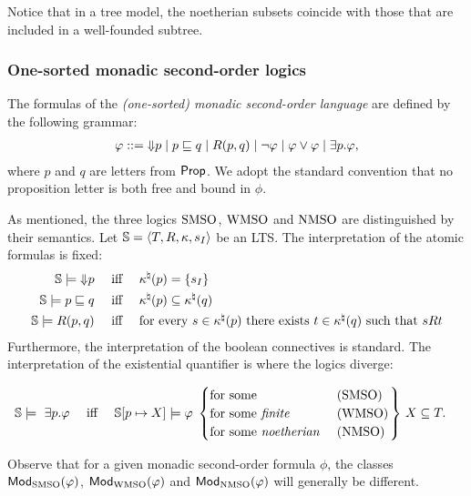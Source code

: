 Notice that in a tree model, the noetherian subsets coincide with those that
are included in a well-founded subtree.

\subsubsection*{One-sorted monadic second-order logics}
%
\begin{definition}\label{def:mso}
The formulas of the \emph{(one-sorted) monadic second-order language} are
defined by the following grammar:
%
\begin{eqnarray*}\label{EQ_mso}
  \phi \isbnf  \here{p} \mid p \inc q \mid R(p,q) \mid \lnot\phi 
     \mid \phi\lor\phi \mid \exists p.\phi,
\end{eqnarray*}
where $p$ and $q$ are letters from $\mathsf{Prop}$.
We  adopt the standard convention that no proposition letter is both free and
bound in $\phi$.
\end{definition}


As mentioned, the three logics $\mathrm{SMSO}$, $\mathrm{WMSO}$ and $\mathrm{NMSO}$ are distinguished by
their semantics. 
Let  $\mathbb{S} = \langle{T,R,\kappa, s_I}\rangle$ be an LTS.
The interpretation of the atomic formulas is fixed:
\begin{align*}
\bbS \models \here{p} & \quad\text{ iff }\quad  \tsval(p) = \{s_I\} \\
\bbS \models p \inc q & \quad\text{ iff }\quad  \tsval(p) \subseteq \tsval(q) \\
\bbS \models R(p,q) & \quad\text{ iff }\quad  \text{for every $s\in \tsval(p)$ there exists $t\in \tsval(q)$ such that $sRt$} 
\end{align*}
Furthermore, the interpretation of the boolean connectives is standard.
The interpretation of the existential quantifier is where the logics diverge:

\begin{align*}
\bbS \models\ \exists p. \phi  & \quad\text{ iff }\quad  \bbS[p \mapsto X] \models \phi \,
\left.\begin{cases}
   \text{for some }                   & (\smso)
\\ \text{for some \emph{finite} }     & (\wmso) 
\\ \text{for some \emph{noetherian} } & (\nmso)
\end{cases}\right\}\,
 X \subseteq T.
\end{align*}

Observe that for a given monadic second-order formula $\phi$, the classes 
$\mathsf{Mod}_{\mathrm{SMSO}}(\varphi)$, $\mathsf{Mod}_{\mathrm{WMSO}}(\varphi)$ and $\mathsf{Mod}_{\mathrm{NMSO}}(\varphi)$ will 
generally be different.

